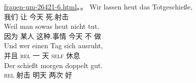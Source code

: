\begin{exe}
\begin{xlist}[iv.]
\begin{exe}
\begin{xlist}[iv.]
{  \href{https://www.elitepartner.de/forum/wie-gehen-die-maenner-mit-den-veraenderten-anspruechen-der-frauen-um-26421-6.html}{frauen-um-26421-6.html}。。
}
\ex
\gll Wir lassen heut das Totgeschieße,\\                   
我们  让    今天  死.射击\\
\gll  Weil  man sowas heut nicht tut.\\
      因为 某人 这种.事情 今天 不 做\\
\gll Und wer einen Tag sich ausruht,\\
     并且 \textsc{rel} 一 天 \textsc{self} 休息\\
\gll Der schießt morgen doppelt gut.\footnotemark\\
\textsc{rel} 射击 明天 两次 好\\

\end{xlist}
\end{exe}
\end{xlist}
\end{exe}
